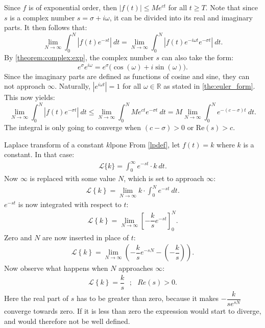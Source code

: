 \begin{prof}{}{}
Since $f$ is of exponential order, then $|f(t)| \leq Me^{ct}$ for all $t \geq T$. Note that since $s$ is a complex number  $s=\sigma+i\omega$, it can be divided into its real and imaginary parts. It then follows that: $$\lim_{N \to \infty} \int_{0}^{N} \left|f(t)e^{-st} \right|\ dt = \lim_{N \to \infty} \int_{0}^{N} \left|f(t) e^{-i\omega t} e^{-\sigma t} \right| \ dt.$$
By \cref{theorem:complex:exp}, the complex number $s$ can also take the form: 
$$e^{\sigma}e^{i\omega}= e^{\sigma} \big(\cos(\omega)+i\sin(\omega) \big).$$
Since the imaginary parts are defined as functions of cosine and sine, they can not approach $\infty$. Naturally, $\left|e^{i\omega t} \right|=1$ for all $\omega \in \mathbb{R}$ as stated in \cref{the:euler_form}. This now yields: $$\lim_{N \to \infty} \int_{0}^{N} |f(t)e^{-\sigma t}|\ dt \leq \lim_{N \to \infty} \int_{0}^{N} Me^{ct}e^{-\sigma t}\ dt = M \lim_{N \to \infty} \int_{0}^{N}e^{-(c-\sigma)t}\ dt. $$ The integral is only going to converge when $(c-\sigma)>0$ or Re$(s)>c$.
\end{prof}

\begin{example}{Laplace transform of a constant $k$}{lpone}
From \cref{lpdef}, let $f(t)=k$ where $k$ is a constant. In that case:
\begin{align*}
\mathcal{L}\{k\}=\int_{0}^{\infty} e^{-st} \cdot k\ dt.
\end{align*}
Now $\infty$ is replaced with some value $N$, which is set to approach $\infty$:
\begin{align*}
\mathcal{L} \left\{k \right\}= \lim_{N \to \infty} k\cdot \int_{0}^{N} e^{-st}\ dt.
\end{align*}
$e^{-st}$ is now integrated with respect to $t$:
\begin{align*}
\mathcal{L} \left\{k \right\}= \lim_{N \to \infty} \left[ -\dfrac{k}{s} e^{-st} \right]_{0}^{N}.  
\end{align*}
Zero and $N$ are now inserted in place of $t$:
\begin{align*}
\mathcal{L} \left\{k \right\}= \lim_{N \to \infty} \left( -\dfrac{k}{s} e^{-sN} - \left(-\dfrac{k}{s}\right) \right).
\end{align*}
Now observe what happens when $N$ approaches $\infty$:
\begin{align*}
\mathcal{L} \left\{k \right\}=\dfrac{k}{s} \ \ \ ; \ \ \ Re(s) > 0.
\end{align*}
Here the real part of $s$ has to be greater than zero, because it makes $-\dfrac{k}{se^{sN}}$ converge towards zero. If it is less than zero the expression would start to diverge, and would therefore not be well defined.
\end{example}

